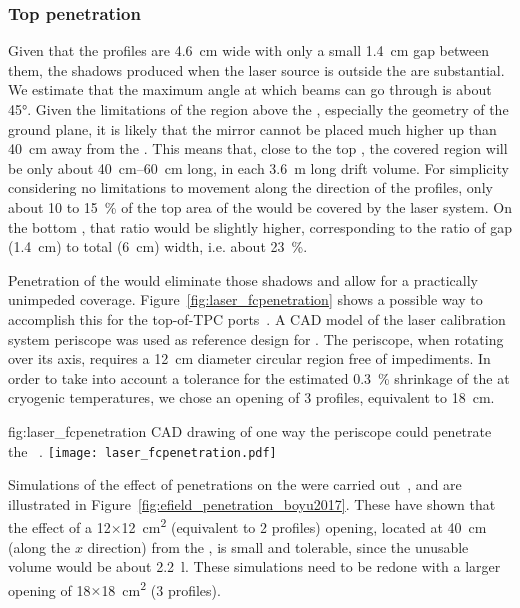 \subsubsection{Top  penetration}
\label{sec:lasertopfcpen}

Given that the  profiles are \SI{4.6}{\cm} wide with only a small \SI{1.4}{\cm} gap between them, the shadows 
produced when the laser source is outside the  are substantial. We estimate that the maximum angle at which beams can go through is about \ang{45}. Given the limitations of the region above the , especially the geometry of the ground plane, it is likely that the mirror cannot be placed much higher up than \SI{40}{\cm} away from the . This means that, close to the top , the covered region will be only about \SIrange{40}{60}{\cm} long, in each \SI{3.6}{\m} long drift volume. 
For simplicity considering no limitations to movement along the direction of the  profiles, 
only about \num{10} to \SI{15}{\%} of the top area of the  would be covered by the laser system. On the bottom , that ratio would be slightly higher, corresponding to the ratio of gap (\SI{1.4}{\cm}) to total (\SI{6}{\cm}) width, i.e. about \SI{23}{\%}.

Penetration of the  would eliminate those shadows and allow for a practically unimpeded coverage. Figure~\ref{fig:laser_fcpenetration} shows a possible way to accomplish this for the top-of-TPC ports~\cite{bib:yu2019a}. A CAD model of the  laser calibration system periscope was used as 
reference design for . The  periscope, when rotating over its axis, requires a \SI{12}{\cm} diameter circular region free of impediments. In order to take into account a tolerance for the estimated \SI{0.3}{\%} shrinkage of the  at cryogenic temperatures, we chose an opening of \num{3} profiles, equivalent to \SI{18}{\cm}.

\begin{dunefigure}{fig:laser_fcpenetration}
{CAD drawing of one way the periscope could penetrate the ~\cite{bib:yu2019a}.}
\texttt{[image: laser\_fcpenetration.pdf]}
\end{dunefigure}

Simulations of the effect of  penetrations on the \efield were carried out~\cite{bib:yu2017b}, and are illustrated in Figure~\ref{fig:efield_penetration_boyu2017}. These have shown that the effect of a \num{12}$\times$\SI{12}{\square\cm} (equivalent to \num{2} profiles) opening, located at \SI{40}{\cm} (along the $x$ direction) from the , is small and tolerable, since the unusable volume would be about \SI{2.2}{\litre}. These simulations need to be redone with a larger opening of \num{18}$\times$\SI{18}{\square\cm} (\num{3} profiles).

